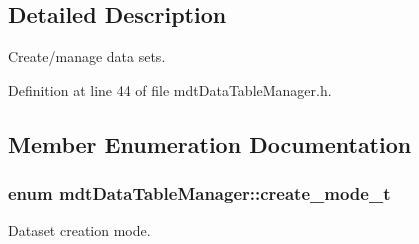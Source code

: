 \subsection{Detailed Description}
Create/manage data sets. 

Definition at line 44 of file mdtDataTableManager.h.



\subsection{Member Enumeration Documentation}
\hypertarget{classmdt_data_table_manager_a2bccf081737f3237ecdbe346dba559a8}{
\subsubsection[{create\_\-mode\_\-t}]{\setlength{\rightskip}{0pt plus 5cm}enum {\bf mdtDataTableManager::create\_\-mode\_\-t}}}
\label{classmdt_data_table_manager_a2bccf081737f3237ecdbe346dba559a8}


Dataset creation mode. 

